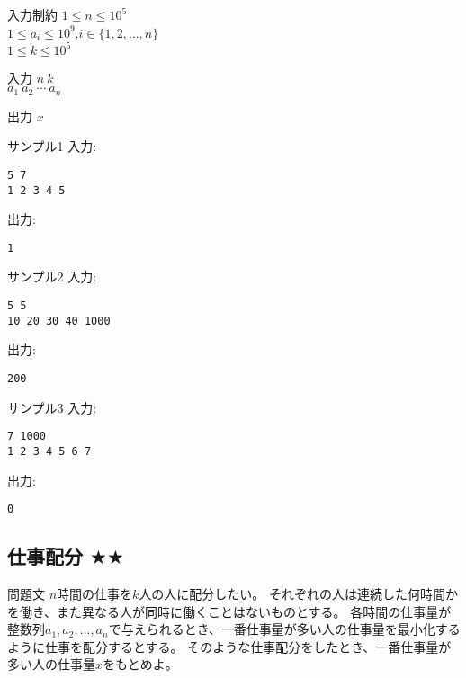 \documentclass[a4paper,twoside,onecolumn,openany,article,10pt]{memoir}
\theoremstyle{remark}
\begin{document}
\begin{itembox}[l]{入力制約}
$1\le n\le 10^5$\\
$1\le a_i\le 10^9$,\hspace{2em}$i\in\{1,2,\dotsc,n\}$\\
$1\le k\le 10^5$
\end{itembox}

\begin{itembox}[l]{入力}
$n~k$\\
$a_1~a_2~\dotsb~a_n$
\end{itembox}

\begin{itembox}[l]{出力}
$x$
\end{itembox}

\begin{itembox}[l]{サンプル1}
入力:
\begin{verbatim}
5 7
1 2 3 4 5
\end{verbatim}
出力:
\begin{verbatim}
1
\end{verbatim}
\end{itembox}

\begin{itembox}[l]{サンプル2}
入力:
\begin{verbatim}
5 5
10 20 30 40 1000
\end{verbatim}
出力:
\begin{verbatim}
200
\end{verbatim}
\end{itembox}

\begin{itembox}[l]{サンプル3}
入力:
\begin{verbatim}
7 1000
1 2 3 4 5 6 7
\end{verbatim}
出力:
\begin{verbatim}
0
\end{verbatim}
\end{itembox}



\clearpage
\subsection{仕事配分 $\bigstar\bigstar$}
\begin{itembox}[l]{問題文}
$n$時間の仕事を$k$人の人に配分したい。
それぞれの人は連続した何時間かを働き、また異なる人が同時に働くことはないものとする。
各時間の仕事量が整数列$a_1,a_2,\dotsc,a_n$で与えられるとき、一番仕事量が多い人の仕事量を最小化するように仕事を配分するとする。
そのような仕事配分をしたとき、一番仕事量が多い人の仕事量$x$をもとめよ。
\end{itembox}
\end{document}
